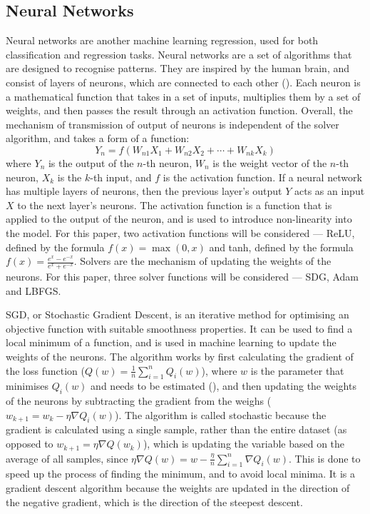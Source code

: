 \documentclass[12pt]{report}
\begin{document}
\subsection{Neural Networks}
Neural networks are another machine learning regression, used for both classification and regression tasks. Neural networks are a set of algorithms that are designed to recognise patterns. They are inspired by the human brain, and consist of layers of neurons, which are connected to each other (\cite{shi2023}). Each neuron is a mathematical function that takes in a set of inputs, multiplies them by a set of weights, and then passes the result through an activation function. Overall, the mechanism of transmission of output of neurons is independent of the solver algorithm, and takes a form of a function:
\begin{equation}
    Y_n = f(W_{n1}X_{1} + W_{n2}X_{2} + \cdots + W_{nk}X_{k})
\end{equation}
where $Y_n$ is the output of the $n$-th neuron, $W_n$ is the weight vector of the $n$-th neuron, $X_k$ is the $k$-th input, and $f$ is the activation function. If a neural network has multiple layers of neurons, then the previous layer's output $Y$ acts as an input $X$ to the next layer's neurons. The activation function is a function that is applied to the output of the neuron, and is used to introduce non-linearity into the model. For this paper, two activation functions will be considered --- ReLU, defined by the formula $f(x) = \max(0,x)$ and tanh, defined by the formula $f(x) = \frac{e^{x}-e^{-x}}{e^{x}+e^{-x}}$. Solvers are the mechanism of updating the weights of the neurons. For this paper, three solver functions will be considered --- SDG, Adam and LBFGS.\@

SGD, or Stochastic Gradient Descent, is an iterative method for optimising an objective function with suitable smoothness properties. It can be used to find a local minimum of a function, and is used in machine learning to update the weights of the neurons. The algorithm works by first calculating the gradient of the loss function ($Q(w)=\frac{1}{n}\sum_{i=1}^{n}Q_i(w)$), where $w$ is the parameter that minimises $Q_i(w)$ and needs to be estimated (\cite{sra2011}), and then updating the weights of the neurons by subtracting the gradient from the weighs ($w_{k+1}=w_{k}-\eta\nabla Q_i(w)$). The algorithm is called stochastic because the gradient is calculated using a single sample, rather than the entire dataset (as opposed to $w_{k+1}=\eta\nabla Q(w_k)$), which is updating the variable based on the average of all samples, since $\eta\nabla Q(w)=w-\frac{\eta}{n}\sum_{i=1}^{n}\nabla Q_i(w)$. This is done to speed up the process of finding the minimum, and to avoid local minima. It is a gradient descent algorithm because the weights are updated in the direction of the negative gradient, which is the direction of the steepest descent.
\end{document}
